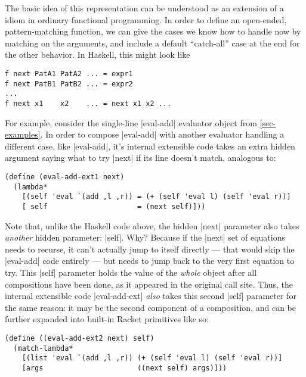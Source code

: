 The basic idea of this representation can be understood as an extension of a idiom in ordinary functional programming.
In order to define an open-ended, pattern-matching function, we can give the cases we know how to handle now by matching on the arguments, and include a default ``catch-all'' case at the end for the other behavior.
In Haskell, this might look like
\begin{verbatim}
f next PatA1 PatA2 ... = expr1
f next PatB1 PatB2 ... = expr2
...
f next x1    x2    ... = next x1 x2 ...
\end{verbatim}

For example, consider the single-line \scm|eval-add| evaluator object from \cref{sec-examples}.
In order to compose \scm|eval-add| with another evaluator handling a different case, like \scm|eval-add|, it's internal extensible code takes an extra hidden argument saying what to try \scm|next| if its line doesn't match, analogous to:
\begin{verbatim}
(define (eval-add-ext1 next)
  (lambda*
    [(self 'eval `(add ,l ,r)) = (+ (self 'eval l) (self 'eval r))]
    [ self                     = (next self)]))
\end{verbatim}
Note that, unlike the Haskell code above, the hidden \scm|next| parameter also takes \emph{another} hidden parameter: \scm|self|.
Why?
Because if the \scm|next| set of equations needs to recurse, it can't actually jump to itself directly --- that would skip the \scm|eval-add| code entirely --- but needs to jump back to the very first equation to try.
This \scm|self| parameter holds the value of the \emph{whole} object after all compositions have been done, as it appeared in the original call site.
Thus, the internal extensible code \scm|eval-add-ext| \emph{also} takes this second \scm|self| parameter for the same reason: it may be the second component of a composition, and can be further expanded into built-in Racket primitives like so:
\begin{verbatim}
(define ((eval-add-ext2 next) self)
  (match-lambda*
    [(list 'eval `(add ,l ,r)) (+ (self 'eval l) (self 'eval r))]
    [args                      ((next self) args)]))
\end{verbatim}

